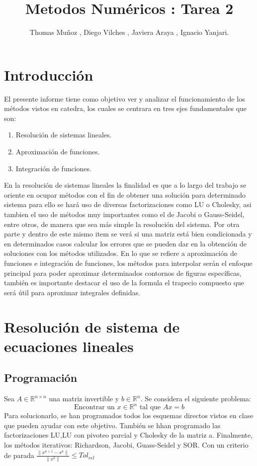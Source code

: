 \documentclass{udpreport}
\title{Metodos Numéricos : Tarea 2}
\author{Thomas Muñoz , Diego Vilches , Javiera Araya , Ignacio Yanjari.}
\providecommand{\norm}[1]{\lVert#1\rVert}
\begin{document}
\maketitle
\tableofcontents
\listoffigures
\chapter{Introducción}
El presente informe tiene como objetivo ver  y analizar el funcionamiento de los métodos vistos en catedra, los cuales se centrara en tres ejes fundamentales que son:
\begin{enumerate}
\item Resolución de sistemas lineales.
\item Aproximación de funciones.
\item Integración de funciones. 
\end{enumerate}

En la resolución de sistemas lineales la finalidad es que a lo largo del trabajo se oriente en ocupar métodos con el fin de obtener una solución para determinado sistema para ello se hará uso de diversas factorizaciones como LU o Cholesky,  asi tambien el uso de métodos muy importantes como el de Jacobi o Gauss-Seidel, entre otros, de manera que sea más simple la resolución del sistema. Por otra parte y dentro de este mismo item se verá si una matriz está bien condicionada  y en determinados casos calcular los errores que se pueden dar en  la obtención de soluciones con los métodos utilizados.
En lo que se refiere a aproximación de funciones e integración de funciones, los métodos para interpolar serán el enfoque principal para poder aproximar determinados contornos de figuras específicas, también es importante destacar el uso de la formula el trapecio compuesto que será útil para aproximar integrales definidas.
\newpage

\chapter{Resolución de sistema de ecuaciones lineales} %
 \section{Programación}
 	Sea $A \in \mathbb{R}^{n \times n}$ una matriz invertible y $b \in \mathbb{R}^{n} $. Se considera el siguiente problema:
 	\begin{equation}
 		\textrm{Encontrar un } x \in \mathbb{R}^{n}\textrm{ tal que }  Ax = b
	\end{equation} 	 
	Para solucionarlo, se han programados todos los esquemas directos vistos en clase que pueden ayudar con este objetivo. También se hhan programado las factorizaciones LU,LU con pivoteo parcial y Cholesky de la matriz a. Finalmente, los métodos iterativos: Richardson, Jacobi, Guass-Seidel y SOR. Con un criterio de parada $\frac{\norm{x^{k+1}-x^k}}{\norm{x^k}} \leq Tol_{rel}$
\end{document}
